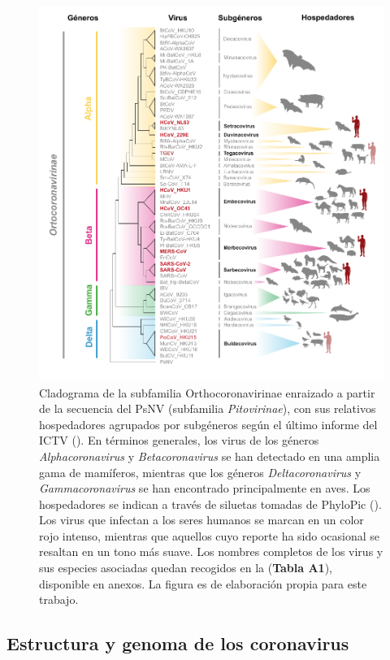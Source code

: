 \begin{figure}[!ht]
    \centering
    \includegraphics[width=1\textwidth]{img/fig1.pdf}
    \caption{Cladograma de la subfamilia Orthocoronavirinae enraizado a 
    partir de la secuencia del PsNV (subfamilia \textit{Pitovirinae}), con sus 
    relativos hospedadores agrupados por subgéneros según el último informe 
    del ICTV (\cite{woo_family_2023}). En términos generales, los virus de 
    los géneros \textit{Alphacoronavirus} y \textit{Betacoronavirus} se han 
    detectado en una amplia gama de mamíferos, mientras que los géneros 
    \textit{Deltacoronavirus} y \textit{Gammacoronavirus} se han encontrado 
    principalmente en aves. Los hospedadores se indican a través de siluetas 
    tomadas de PhyloPic (\cite{keesey_phylopic_2023}). Los virus que 
    infectan a los seres humanos se marcan en un color rojo intenso, 
    mientras que aquellos cuyo reporte ha sido ocasional se resaltan en un 
    tono más suave. Los nombres completos de los virus y sus especies 
    asociadas quedan recogidos en la (\textbf{Tabla A1}), disponible en 
    anexos. La figura es de elaboración propia para este trabajo.}\label{fig:cladogram}
\end{figure}

\subsection{Estructura y genoma de los coronavirus}

